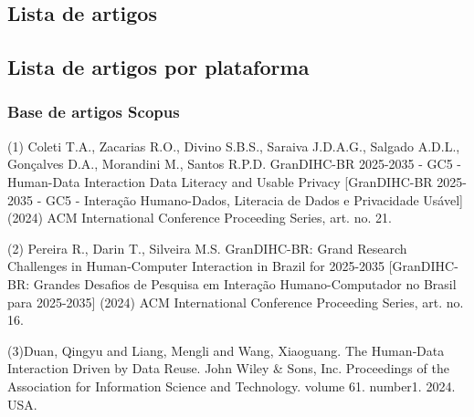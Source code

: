 \documentclass[
	12pt,				%
	oneside,			%
	a4paper,			%
	english,			%
	brazil				%
	]{abntex2ppgsi}
\begin{document}
\begin{apendicesenv}

\partapendices


\chapter{Lista de artigos}\label{Apendice_A}
\section*{Lista de artigos por plataforma}

\subsection{Base de artigos Scopus}\label{list:scopus}

(1) Coleti T.A., Zacarias R.O., Divino S.B.S., Saraiva J.D.A.G., Salgado A.D.L., Gonçalves D.A., Morandini M., Santos R.P.D. GranDIHC-BR 2025-2035 - GC5 - Human-Data Interaction Data Literacy and Usable Privacy [GranDIHC-BR 2025-2035 - GC5 - Interação Humano-Dados, Literacia de Dados e Privacidade Usável]
(2024) ACM International Conference Proceeding Series, art. no. 21.

(2) Pereira R., Darin T., Silveira M.S. GranDIHC-BR: Grand Research Challenges in Human-Computer Interaction in Brazil for 2025-2035 [GranDIHC-BR: Grandes Desafios de Pesquisa em Interação Humano-Computador no Brasil para 2025-2035] (2024) ACM International Conference Proceeding Series, art. no. 16.

(3)Duan, Qingyu and Liang, Mengli and Wang, Xiaoguang. The Human‐Data Interaction Driven by Data Reuse. John Wiley \& Sons, Inc. Proceedings of the Association for Information Science and Technology. volume 61. number1. 2024. USA.


\end{apendicesenv}
\end{document}
